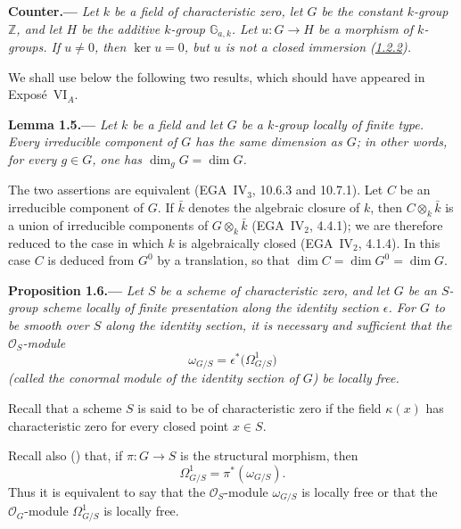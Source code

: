 
\medskip
{}\label{ctr:sga3-VIB-1.4.3}%
\noindent\textbf{Counter.---}
\emph{Let \(k\) be a field of characteristic zero, let \(G\) be
the constant \(k\)-group \(\mathbb Z\), and let \(H\) be the
additive \(k\)-group \(\mathbb G_{a,k}\). Let \(u:G\to H\) be a
morphism of \(k\)-groups. If \(u\ne0\), then \(\ker u=0\), but
\(u\) is not a closed immersion (\hyperref[ctr:sga3-VIB-1.2.2]{1.2.2}).}

We shall use below the following two results, which should have
appeared in Expos\'e~VI\(_A\).

\medskip
{}\label{lem:sga3-VIB-1.5}%
\noindent\textbf{Lemma 1.5.---}
\emph{Let \(k\) be a field and let \(G\) be a \(k\)-group locally
of finite type. Every irreducible component of \(G\) has the same dimension
as \(G\); in other words, for every \(g\in G\), one has
\(\dim_gG=\dim G\).}

The two assertions are equivalent (EGA~IV\(_3\), 10.6.3 and 10.7.1). Let
\(C\) be an irreducible component of \(G\). If \(\bar k\) denotes the
algebraic closure of \(k\), then \(C\otimes_k\bar k\) is a union of
irreducible components of \(G\otimes_k\bar k\) (EGA~IV\(_2\), 4.4.1); we
are therefore reduced to the case in which \(k\) is algebraically closed
(EGA~IV\(_2\), 4.1.4). In this case \(C\) is deduced from \(G^0\) by a
translation, so that \(\dim C=\dim G^0=\dim G\).

\medskip
{}\label{prop:sga3-VIB-1.6}%
\noindent\textbf{Proposition 1.6.---}
\emph{Let \(S\) be a scheme of characteristic zero, and let \(G\)
be an \(S\)-group scheme locally of finite presentation along the
identity section \(\epsilon\). For \(G\) to be smooth over \(S\) along the
identity section, it is necessary and sufficient that the
\(\mathcal O_S\)-module}
\[
  \omega_{G/S}
    =\epsilon^*\bigl(\Omega^1_{G/S}\bigr)
\]
\emph{\textup(called the conormal module of the identity section of \(G\)\textup)
be locally free.}

Recall that a scheme \(S\) is said to be of characteristic zero if
the field \(\kappa(x)\) has characteristic zero for every closed
point \(x\in S\).

Recall also () that, if
\(\pi:G\to S\) is the structural morphism, then
\[
  \Omega^1_{G/S}=\pi^*(\omega_{G/S}).
\]
Thus it is equivalent to say that the \(\mathcal O_S\)-module
\(\omega_{G/S}\) is locally free or that the
\(\mathcal O_G\)-module \(\Omega^1_{G/S}\) is locally free.

